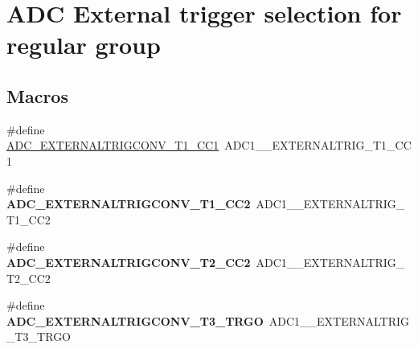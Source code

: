 \hypertarget{group___a_d_c___external__trigger__source___regular}{}\section{A\+DC External trigger selection for regular group}
\label{group___a_d_c___external__trigger__source___regular}
\subsection*{Macros}
\begin{DoxyCompactItemize}
\item 
\#define \hyperlink{group___a_d_c___external__trigger__source___regular_ga7d49b9a93e2452633d650a5bfd2cce23}{A\+D\+C\+\_\+\+E\+X\+T\+E\+R\+N\+A\+L\+T\+R\+I\+G\+C\+O\+N\+V\+\_\+\+T1\+\_\+\+C\+C1}~A\+D\+C1\+\_\+\_\+\+E\+X\+T\+E\+R\+N\+A\+L\+T\+R\+I\+G\+\_\+\+T1\+\_\+\+C\+C1
\item 
\mbox{\label{group___a_d_c___external__trigger__source___regular_gaf40cf21366c12d956241193bca60b1f9}} 
\#define {\bfseries A\+D\+C\+\_\+\+E\+X\+T\+E\+R\+N\+A\+L\+T\+R\+I\+G\+C\+O\+N\+V\+\_\+\+T1\+\_\+\+C\+C2}~A\+D\+C1\+\_\+\_\+\+E\+X\+T\+E\+R\+N\+A\+L\+T\+R\+I\+G\+\_\+\+T1\+\_\+\+C\+C2
\item 
\mbox{\label{group___a_d_c___external__trigger__source___regular_ga0b64a9b8ac627c2ca770622c8ada41e6}} 
\#define {\bfseries A\+D\+C\+\_\+\+E\+X\+T\+E\+R\+N\+A\+L\+T\+R\+I\+G\+C\+O\+N\+V\+\_\+\+T2\+\_\+\+C\+C2}~A\+D\+C1\+\_\+\_\+\+E\+X\+T\+E\+R\+N\+A\+L\+T\+R\+I\+G\+\_\+\+T2\+\_\+\+C\+C2
\item 
\mbox{\label{group___a_d_c___external__trigger__source___regular_ga41bef7b6bfdb6641a97e89aa4abc405e}} 
\#define {\bfseries A\+D\+C\+\_\+\+E\+X\+T\+E\+R\+N\+A\+L\+T\+R\+I\+G\+C\+O\+N\+V\+\_\+\+T3\+\_\+\+T\+R\+GO}~A\+D\+C1\+\_\+\_\+\+E\+X\+T\+E\+R\+N\+A\+L\+T\+R\+I\+G\+\_\+\+T3\+\_\+\+T\+R\+GO
\item 
\mbox{\label{group___a_d_c___external__trigger__source___regular_gae0e57ccf3d178e6819ce32c0124e4f0f}} 

\end{DoxyCompactItemize}
